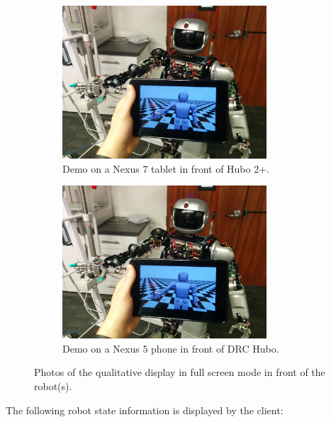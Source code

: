 \documentclass[letterpaper, 10 pt, conference]{ieee/ieeeconf}  %
\begin{document}
\begin{figure}[ptb]
    \centering
    \begin{subfigure}[b]{3in}
        \centering
        \includegraphics[width=3in]{figures/hubo.jpg}
        \caption{Demo on a Nexus 7 tablet in front of Hubo 2+.}
        \label{fig:Hubo}
    \end{subfigure}%
    \quad
    \begin{subfigure}[b]{3in}
        \centering
        \includegraphics[width=3in]{figures/hubo.jpg}
        \caption{Demo on a Nexus 5 phone in front of DRC Hubo.}
        \label{fig:DRCHubo}
    \end{subfigure}%
    \caption{Photos of the qualitative display in full screen mode in front of the robot(s).}
    \label{fig:Photos}
\end{figure}

The following robot state information is displayed by the client:
\end{document}
